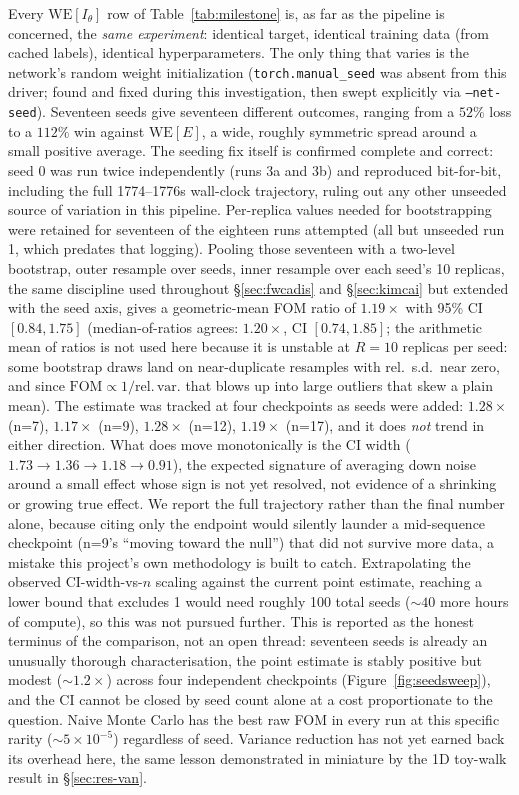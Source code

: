 \documentclass[a4paper,fleqn]{cas-sc}
\begin{document}
	Every $\mathrm{WE}[I_\theta]$ row of Table~\ref{tab:milestone} is, as far as the pipeline
	is concerned, the
	\emph{same experiment}: identical target, identical training data (from cached labels),
	identical hyperparameters. The only thing that varies is the network's random weight
	initialization (\texttt{torch.manual\_seed} was absent from this driver; found and
	fixed during this investigation, then swept explicitly via \texttt{--net-seed}).
	Seventeen seeds give seventeen different outcomes, ranging from a $52\%$ loss to
	a $112\%$ win against $\mathrm{WE}[E]$, a wide, roughly symmetric spread around a
	small positive average. The seeding fix itself is confirmed complete and correct: seed
	0 was run twice independently (runs 3a and 3b) and reproduced bit-for-bit, including the
	full 1774--1776s wall-clock trajectory, ruling out any other unseeded source of
	variation in this pipeline. Per-replica values needed for bootstrapping were retained
	for seventeen of the eighteen runs attempted (all but unseeded run 1, which predates that
	logging).
	Pooling those seventeen with a two-level bootstrap, outer resample over seeds,
	inner resample over each seed's 10 replicas, the same discipline used throughout
	\S\ref{sec:fwcadis} and \S\ref{sec:kimcai} but extended with the seed axis, gives a
	geometric-mean FOM ratio of $1.19\times$ with 95\% CI $[0.84, 1.75]$ (median-of-ratios
	agrees: $1.20\times$, CI $[0.74, 1.85]$; the arithmetic mean of ratios is not used here
	because it is unstable at $R=10$ replicas per seed: some bootstrap draws land on
	near-duplicate resamples with rel.\ s.d.\ near zero, and since $\mathrm{FOM}\propto
	1/\mathrm{rel.\,var.}$ that blows up into large outliers that skew a plain mean).
	The estimate was tracked at four checkpoints as seeds were added: $1.28\times$
	(n=7), $1.17\times$ (n=9), $1.28\times$ (n=12), $1.19\times$ (n=17), and it does
	\emph{not} trend in either direction. What does move monotonically is the CI width
	($1.73\to1.36\to1.18\to0.91$), the expected signature of averaging down noise around a
	small effect whose sign is not yet resolved, not evidence of a shrinking or growing true
	effect. We report the full trajectory rather than the final number alone, because citing
	only the endpoint would silently launder a mid-sequence checkpoint (n=9's ``moving
	toward the null'') that did not survive more data, a mistake this project's own
	methodology is built to catch.
	Extrapolating the observed CI-width-vs-$n$ scaling against the current point
	estimate, reaching a lower bound that excludes 1 would need roughly 100 total seeds
	($\sim\!40$ more hours of compute), so this was not pursued further. This is reported as
	the honest terminus of the comparison, not an open
	thread: seventeen seeds is already an unusually thorough characterisation, the point
	estimate is stably positive but modest ($\sim\!1.2\times$) across four independent
	checkpoints (Figure~\ref{fig:seedsweep}), and the CI cannot be closed by seed count alone
	at a cost proportionate to
	the question. Naive Monte Carlo has the best raw FOM in every run
	at this specific rarity ($\sim\!5\times10^{-5}$) regardless of seed. Variance
	reduction has not yet earned back its overhead here, the same lesson demonstrated in
	miniature by the 1D toy-walk result in \S\ref{sec:res-van}.
	
\end{document}

